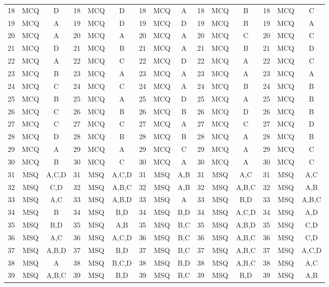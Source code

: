 \documentclass[11pt,a4paper]{article}
\begin{document}
\begin{center}
\begin{tabularx}{\textwidth}{ccc|ccc|ccc|ccc|ccc}
18 & MCQ & D & 18 & MCQ & D & 18 & MCQ & A & 18 & MCQ & B & 18 & MCQ & C \\
19 & MCQ & A & 19 & MCQ & D & 19 & MCQ & D & 19 & MCQ & B & 19 & MCQ & A \\
20 & MCQ & A & 20 & MCQ & A & 20 & MCQ & A & 20 & MCQ & C & 20 & MCQ & C \\
21 & MCQ & D & 21 & MCQ & B & 21 & MCQ & A & 21 & MCQ & B & 21 & MCQ & D \\
22 & MCQ & A & 22 & MCQ & C & 22 & MCQ & D & 22 & MCQ & A & 22 & MCQ & C \\
23 & MCQ & B & 23 & MCQ & A & 23 & MCQ & A & 23 & MCQ & A & 23 & MCQ & A \\
24 & MCQ & C & 24 & MCQ & C & 24 & MCQ & A & 24 & MCQ & B & 24 & MCQ & B \\
25 & MCQ & B & 25 & MCQ & A & 25 & MCQ & D & 25 & MCQ & A & 25 & MCQ & B \\
26 & MCQ & C & 26 & MCQ & B & 26 & MCQ & B & 26 & MCQ & D & 26 & MCQ & B \\
27 & MCQ & C & 27 & MCQ & C & 27 & MCQ & A & 27 & MCQ & C & 27 & MCQ & D \\
28 & MCQ & D & 28 & MCQ & B & 28 & MCQ & B & 28 & MCQ & A & 28 & MCQ & B \\
29 & MCQ & A & 29 & MCQ & A & 29 & MCQ & C & 29 & MCQ & A & 29 & MCQ & C \\
30 & MCQ & B & 30 & MCQ & C & 30 & MCQ & A & 30 & MCQ & A & 30 & MCQ & C \\
31 & MSQ & A,C,D & 31 & MSQ & A,C,D & 31 & MSQ & A,B & 31 & MSQ & A,C & 31 & MSQ & A,C \\
32 & MSQ & C,D & 32 & MSQ & A,B,C & 32 & MSQ & A,B & 32 & MSQ & A,B,C & 32 & MSQ & A,B \\
33 & MSQ & A,C & 33 & MSQ & A,B,D & 33 & MSQ & A & 33 & MSQ & B,D & 33 & MSQ & A,B,C \\
34 & MSQ & B & 34 & MSQ & B,D & 34 & MSQ & B,D & 34 & MSQ & A,C,D & 34 & MSQ & A,D \\
35 & MSQ & B,D & 35 & MSQ & A,B & 35 & MSQ & B,C & 35 & MSQ & A,B,D & 35 & MSQ & C,D \\
36 & MSQ & A,C & 36 & MSQ & A,C,D & 36 & MSQ & B,C & 36 & MSQ & A,B,C & 36 & MSQ & C,D \\
37 & MSQ & A,B,D & 37 & MSQ & B,D & 37 & MSQ & B,C & 37 & MSQ & A,B,C & 37 & MSQ & A,C,D \\
38 & MSQ & A & 38 & MSQ & B,C,D & 38 & MSQ & B,D & 38 & MSQ & A,B,C & 38 & MSQ & A,C \\
39 & MSQ & A,B,C & 39 & MSQ & B,D & 39 & MSQ & B,C & 39 & MSQ & B,D & 39 & MSQ & A,B \\

\end{tabularx}
\end{center}
\end{document}
